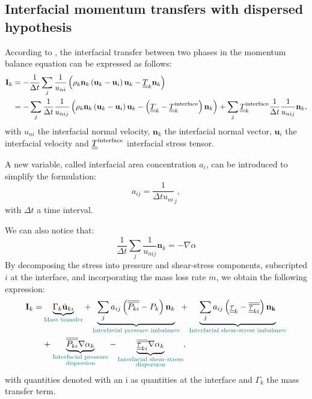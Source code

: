 \subsection{Interfacial momentum transfers with dispersed hypothesis}
According to \cite{LivreIH}, the interfacial transfer between two phases in the momentum balance equation can be expressed as follows:
\begin{equation}
\begin{aligned}
\mathbf{I}_k & =-\frac{1}{\Delta t}\sum_j \frac{1}{u_{ni}}\left( \rho_k\mathbf{n}_k\left( \mathbf{u}_k-\mathbf{u}_i \right)\mathbf{u}_k-\underline{\underline{T}}_k\mathbf{n}_k \right)\\ 
&=-\sum_j \frac{1}{\Delta t}\frac{1}{u_{nij}} \left( \rho_k\mathbf{n}_k\left( \mathbf{u}_k-\mathbf{u}_i \right)\mathbf{u}_k-\left( \underline{\underline{T}}_k-\underline{\underline{T}}^{\text{interface}}_{k} \right)\mathbf{n}_k \right)+\sum_j \underline{\underline{T}}^{\text{interface}}_{k}\frac{1}{\Delta t}\frac{1}{u_{nij}}\mathbf{n}_k,
\end{aligned}
\end{equation}
with $u_{ni}$ the interfacial normal velocity, $\mathbf{n}_k$ the interfacial normal vector, $\mathbf{u}_i$ the interfacial velocity and $\underline{\underline{T}}^{\text{interface}}$ interfacial stress tensor.

A new variable, called interfacial area concentration $a_i$, can be introduced to simplify the formulation:
\begin{equation}
    a_{ij}=\frac{1}{\Delta t u_{ni}}_j,
\end{equation}
with $\Delta t$ a time interval. 

We can also notice that:
\begin{equation}
\frac{1}{\Delta t}\sum_j \frac{1}{u_{nij}}\mathbf{n}_k=- \nabla \alpha
\end{equation}
By decomposing the stress into pressure and shear-stress components, subscripted $i$ at the interface, and incorporating the mass loss rate $\dot{m}$, we obtain the following expression:
\begin{equation}
\begin{aligned}
\mathbf{I}_k= &\underbrace{\Gamma_k \tilde{\mathbf{u}}_{ki}}_{\color{myteal}\text{Mass transfer}} + \underbrace{\sum_j a_{ij}\parent{\overline{\overline{P_{ki}}}-P_k}\mathbf{n}_k}_{\color{myteal}\text{Interfacial pressure imbalance}} + \underbrace{\sum_j a_{ij} \parent{{\ull{\tau}}_{k} - \overline{\overline{{\ull{\tau}}_{ki}}}}\mathbf{n_k}}_{\color{myteal}\text{Interfacial shear-stress imbalance}}\\ 
& +\underbrace{\overline{\overline{P_{ki}}}\nabla \alpha_k}_{\color{myteal}\substack{\text{Interfacial pressure}\\\text{dispersion}}} - \underbrace{\overline{\overline{{\ull{\tau}}_{ki}}}\nabla \alpha_k}_{\color{myteal}\substack{\text{Interfacial shear-stress}\\\text{dispersion}}},
\end{aligned}
\end{equation}
with quantities denoted with an i as quantities at the interface and $\Gamma_k$ the mass transfer term.

